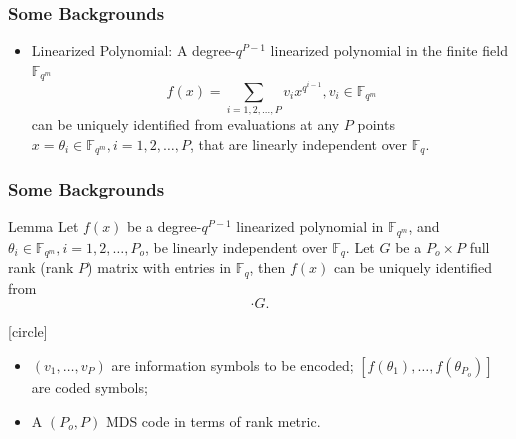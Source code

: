 \documentclass{beamer}
\begin{document}
\begin{frame}
\frametitle{Some Backgrounds}
\begin{itemize}
\item Linearized Polynomial:
A degree-$q^{P-1}$ linearized polynomial in the finite field $\mathbb{F}_{q^m}$
\begin{equation}
f(x) = \sum_{i = 1,2,\ldots, P} v_i x^{q^{i-1}}, v_i \in \mathbb{F}_{q^m}
\end{equation}
can be uniquely identified from evaluations at any $P$ points $x = \theta_{i} \in \mathbb{F}_{q^m}, i = 1,2,\ldots, P$, that are linearly independent over $\mathbb{F}_q$.
\end{itemize}
\end{frame}

\begin{frame}
\frametitle{Some Backgrounds}
\begin{block}{Lemma}
Let $f(x)$ be a degree-$q^{P-1}$ linearized polynomial in $\mathbb{F}_{q^m}$, and $\theta_i \in \mathbb{F}_{q^m}, i = 1,2,\ldots,P_o$, be linearly independent over $\mathbb{F}_q$. Let $G$ be a $P_o \times P$ full rank (rank $P$) matrix with entries in $\mathbb{F}_q$, then $f(x)$ can be  uniquely identified from 
\begin{equation}
[f(\theta_1), f(\theta_2), \ldots, f(\theta_{P_o})] \cdot G.
\end{equation}
\end{block}

[circle]
\begin{itemize}
\item $(v_1,\ldots, v_P)$ are information symbols to be encoded; $[f(\theta_1),\ldots,f(\theta_{P_o})]$ are coded symbols;
\item A $(P_o,P)$ MDS code in terms of rank metric.
\end{itemize}
\end{frame}
\end{document}
